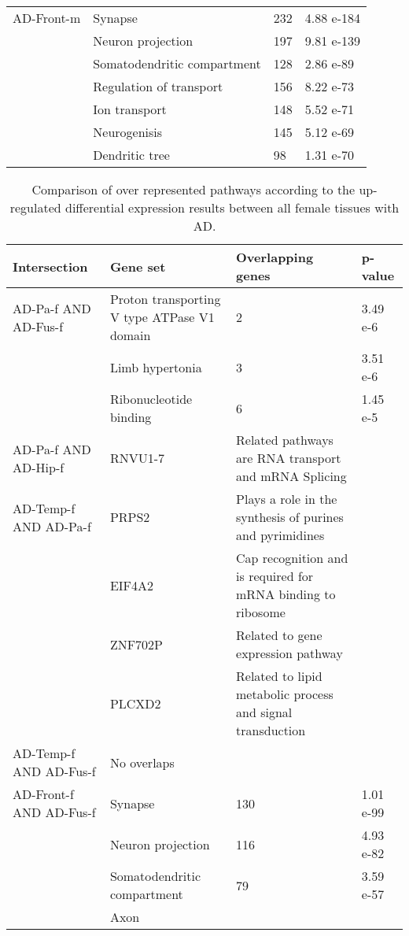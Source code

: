 \begin{table}[!ht]
\begin{tabularx}{1.0\textwidth}{L{2cm}L{2.5cm}L{8cm}C{1.5cm}}
AD-Front-m &
  Synapse &
 232 &
  4.88 e-184 \\
 &
  Neuron projection &
  197 &
  9.81 e-139 \\
 &
  Somatodendritic compartment &
  128 &
  2.86 e-89 \\
 &
  Regulation of transport &
  156 &
  8.22 e-73 \\
 &
  Ion transport &
  148 &
  5.52 e-71 \\
 &
  Neurogenisis &
  145 &
  5.12 e-69 \\
 &
  Dendritic tree &
  98 &
  1.31 e-70 \\
  \bottomrule
\end{tabularx}
\end{table}


\begin{table}[!ht]
\small
\centering
\caption{Comparison of over represented pathways according to the up-regulated differential expression results between all female tissues with AD.}
\label{tab:broken3}
\begin{tabularx}{1.0\textwidth}{L{2cm}L{2.5cm}L{8cm}C{1.5cm}}
\toprule
\textbf{Intersection} & \textbf{Gene set} & \textbf{Overlapping genes} & \textbf{p-value} \\
\midrule
AD-Pa-f AND AD-Fus-f &
  Proton transporting V type ATPase V1 domain &
  2 &
  3.49 e-6 \\
 &
  Limb hypertonia &
  3 &
  3.51 e-6 \\
 &
  Ribonucleotide binding &
  6 &
  1.45 e-5 \\
AD-Pa-f AND AD-Hip-f &
  RNVU1-7 &
  Related pathways are RNA transport and mRNA Splicing &
   \\
AD-Temp-f AND AD-Pa-f &
  PRPS2 &
  Plays a role in the synthesis of purines and pyrimidines &
   \\
 &
  EIF4A2 &
  Cap recognition and is required for mRNA binding to ribosome &
   \\
 &
  ZNF702P &
  Related to gene expression pathway &
   \\
 &
  PLCXD2 &
  Related to lipid metabolic process and signal transduction &
   \\
AD-Temp-f AND AD-Fus-f &
  No overlaps &
   &
   \\
AD-Front-f AND AD-Fus-f &
  Synapse &
  130 &
  1.01 e-99 \\
 &
  Neuron projection &
  116 &
  4.93 e-82 \\
 &
  Somatodendritic compartment &
  79 &
  3.59 e-57 \\
 &
  Axon &

\end{tabularx}
\end{table}
